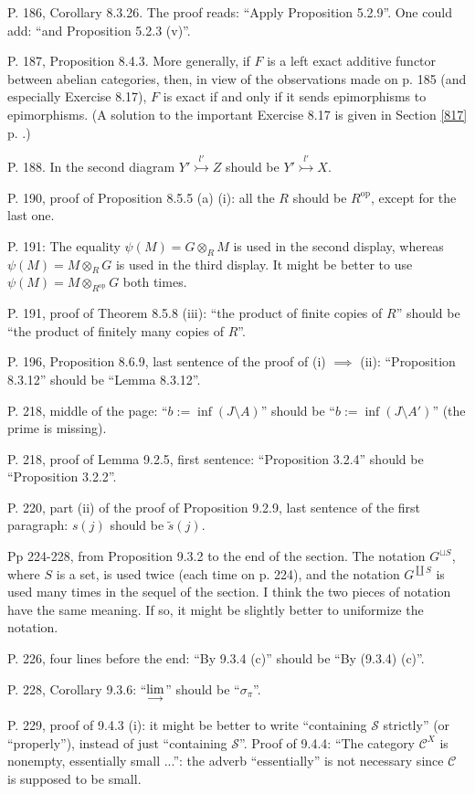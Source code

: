 \documentclass[12pt]{article}
\theoremstyle{remark}
\newcommand{\n}{\noindent}
\newcommand{\C}{\mathcal C}
\newcommand{\m}{\rightarrowtail}
\newcommand{\op}{\text{op}}
\newcommand{\ilim}{\operatornamewithlimits{\underset{\longrightarrow}{lim}}}
\begin{document}
\n P. 186, Corollary 8.3.26. The proof reads: ``Apply Proposition 5.2.9''. One could add: ``and Proposition 5.2.3 (v)''. 

\n P. 187, Proposition 8.4.3. More generally, if $F$ is a left exact additive functor between abelian categories, then, in view of the observations made on p. 185 (and especially Exercise 8.17), $F$ is exact if and only if it sends epimorphisms to epimorphisms. (A solution to the important Exercise 8.17 is given in Section \ref{817} p. \pageref{817}.) 

\n P. 188. In the second diagram $Y'\overset{l'}{\m}Z$ should be $Y'\overset{l'}{\m}X$. 

\n P. 190, proof of Proposition 8.5.5 (a) (i): all the $R$ should be $R^\op$, except for the last one.

\n P. 191: The equality $\psi(M)=G\otimes_RM$ is used in the second display, whereas $\psi(M)=M\otimes_RG$ is used in the third display. It might be better to use $\psi(M)=M\otimes_{R^\op}G$ both times.

\n P. 191, proof of Theorem 8.5.8 (iii): ``the product of finite copies of $R$'' should be ``the product of finitely many copies of $R$''.

\n P. 196, Proposition 8.6.9, last sentence of the proof of (i) $\implies$ (ii): ``Proposition 8.3.12'' should be ``Lemma 8.3.12''.

\n P. 218, middle of the page: ``$b:=\inf(J\setminus A)$'' should be ``$b:=\inf(J\setminus A')$'' (the prime is missing).

\n P. 218, proof of Lemma 9.2.5, first sentence: ``Proposition 3.2.4'' should be ``Proposition 3.2.2''.

\n P. 220, part (ii) of the proof of Proposition 9.2.9, last sentence of the first paragraph: $s(j)$ should be $\tilde s(j)$.

\n Pp 224-228, from Proposition 9.3.2 to the end of the section. The notation $G^{\sqcup S}$, where $S$ is a set, is used twice (each time on p. 224), and the notation $G^{\coprod S}$ is used many times in the sequel of the section. I think the two pieces of notation have the same meaning. If so, it might be slightly better to uniformize the notation.

\n P. 226, four lines before the end: ``By 9.3.4 (c)'' should be ``By (9.3.4) (c)''.

\n P. 228, Corollary 9.3.6: ``$\ilim$'' should be ``$\sigma_\pi$''.

\n P. 229, proof of 9.4.3 (i): it might be better to write ``containing $\mathcal S$ strictly'' (or ``properly''), instead of just ``containing $\mathcal S$''. Proof of 9.4.4: ``The category $\C^X$ is nonempty, essentially small ...'': the adverb ``essentially'' is not necessary since $\C$ is supposed to be small.
\end{document}
